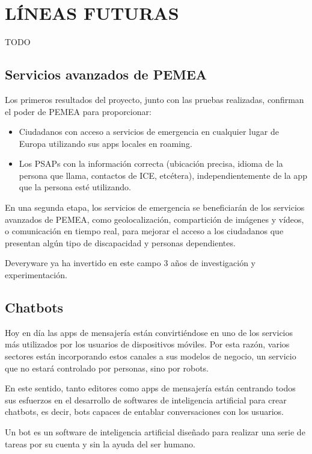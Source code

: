 \chapter{LÍNEAS FUTURAS\label{sec:lineasfuturas}}

TODO

\clearpage

\section{Servicios avanzados de PEMEA}

Los primeros resultados del proyecto, junto con las pruebas realizadas, confirman el poder de PEMEA para proporcionar:

\begin{itemize}
  \item Ciudadanos con acceso a servicios de emergencia en cualquier lugar de Europa utilizando sus apps locales en roaming.
  \item Los PSAPs con la información correcta (ubicación precisa, idioma de la persona que llama, contactos de ICE, etcétera), independientemente de la app que la persona esté utilizando.
\end{itemize}

En una segunda etapa, los servicios de emergencia se beneficiarán de los servicios avanzados de PEMEA, como geolocalización, compartición de imágenes y vídeos, o comunicación en tiempo real, para mejorar el acceso a los ciudadanos que presentan algún tipo de discapacidad y personas dependientes.

Deveryware ya ha invertido en este campo 3 años de investigación y experimentación.

\section{Chatbots}

Hoy en día las apps de mensajería están convirtiéndose en uno de los servicios más utilizados por los usuarios de dispositivos móviles. Por esta razón, varios sectores están incorporando estos canales a sus modelos de negocio, un servicio que no estará controlado por personas, sino por robots.

En este sentido, tanto editores como apps de mensajería están centrando todos sus esfuerzos en el desarrollo de softwares de inteligencia artificial para crear chatbots, es decir, bots capaces de entablar conversaciones con los usuarios.

Un bot es un software de inteligencia artificial diseñado para realizar una serie de tareas por su cuenta y sin la ayuda del ser humano.

